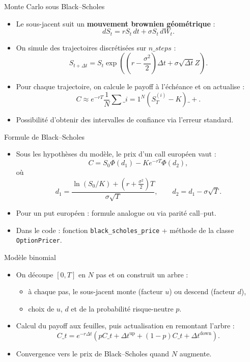 \documentclass[aspectratio=169]{beamer}
\begin{document}
\begin{frame}{Monte Carlo sous Black--Scholes}
  \begin{itemize}
    \item Le sous-jacent suit un \textbf{mouvement brownien g\'eom\'etrique} :
    \[
      dS_t = r S_t\,dt + \sigma S_t\,dW_t.
    \]
    \item On simule des trajectoires discr\'etis\'ees sur $n\_steps$ :
    \[
      S_{t+\Delta t} = S_t
        \exp\left(
          \left(r - \frac{\sigma^2}{2}\right)\Delta t + \sigma \sqrt{\Delta t} Z
        \right).
    \]
    \item Pour chaque trajectoire, on calcule le payoff \`a l'\'ech\'eance et on actualise :
    \[
      C \approx e^{-rT} \frac{1}{N}\sum\_{i=1}^N (S_T^{(i)} - K)\_+.
    \]
    \item Possibilit\'e d'obtenir des intervalles de confiance via l'erreur standard.
  \end{itemize}
\end{frame}

\begin{frame}{Formule de Black--Scholes}
  \begin{itemize}
    \item Sous les hypoth\`eses du mod\`ele, le prix d'un call europ\'een vaut :
    \[
      C = S_0 \Phi(d_1) - K e^{-rT} \Phi(d_2),
    \]
    o\`u
    \[
      d_1 = \frac{\ln(S_0/K) + (r + \frac{\sigma^2}{2})T}{\sigma \sqrt{T}},
      \qquad d_2 = d_1 - \sigma \sqrt{T}.
    \]
    \item Pour un put europ\'een : formule analogue ou via parit\'e call--put.
    \item Dans le code : fonction \texttt{black\_scholes\_price} + m\'ethode de la classe \texttt{OptionPricer}.
  \end{itemize}
\end{frame}

\begin{frame}{Mod\`ele binomial}
  \begin{itemize}
    \item On d\'ecoupe $[0,T]$ en $N$ pas et on construit un arbre :
      \begin{itemize}
        \item \`a chaque pas, le sous-jacent monte (facteur $u$) ou descend (facteur $d$),
        \item choix de $u$, $d$ et de la probabilit\'e risque-neutre $p$.
      \end{itemize}
    \item Calcul du payoff aux feuilles, puis actualisation en remontant l'arbre :
    \[
      C\_{t} = e^{-r\Delta t}(p C\_{t+\Delta t}^{\text{up}} + (1-p) C\_{t+\Delta t}^{\text{down}}).
    \]
    \item Convergence vers le prix de Black--Scholes quand $N$ augmente.
  \end{itemize}
\end{frame}
\end{document}
